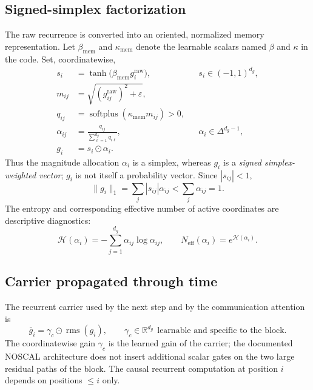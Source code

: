 \documentclass[11pt,a4paper]{article}
\newcommand{\R}{\mathbb{R}}
\newcommand{\softplus}{\operatorname{softplus}}
\newcommand{\gbar}{\bar g}
\begin{document}
\subsection{Signed-simplex factorization}

The raw recurrence is converted into an oriented, normalized memory representation. Let
$\beta_{\mathrm{mem}}$ and $\kappa_{\mathrm{mem}}$ denote the learnable scalars named $\beta$ and $\kappa$ in the code. Set, coordinatewise,
\begin{align}
s_i&=\tanh\bigl(\beta_{\mathrm{mem}}g_i^{\mathrm{raw}}\bigr), && s_i\in(-1,1)^{d_g},\\
m_{ij}&=\sqrt{(g_{ij}^{\mathrm{raw}})^2+\varepsilon},\\
q_{ij}&=\softplus(\kappa_{\mathrm{mem}}m_{ij})>0,\\
\alpha_{ij}&=\frac{q_{ij}}{\sum_{\ell=1}^{d_g}q_{i\ell}}, && \alpha_i\in\Delta^{d_g-1},\\
g_i&=s_i\odot\alpha_i.
\end{align}
Thus the magnitude allocation $\alpha_i$ is a simplex, whereas $g_i$ is a \emph{signed simplex-weighted
vector}; $g_i$ is not itself a probability vector. Since $|s_{ij}|<1$,
\begin{equation}
\|g_i\|_1=\sum_j|s_{ij}|\alpha_{ij}<\sum_j\alpha_{ij}=1.
\end{equation}
The entropy and corresponding effective number of active coordinates are descriptive diagnostics:
\begin{equation}
\mathcal H(\alpha_i)=-\sum_{j=1}^{d_g}\alpha_{ij}\log\alpha_{ij},\qquad
N_{\mathrm{eff}}(\alpha_i)=e^{\mathcal H(\alpha_i)}.
\end{equation}

\subsection{Carrier propagated through time}

The recurrent carrier used by the next step and by the communication attention is
\begin{equation}
\gbar_i=\gamma_c\odot\operatorname{rms}(g_i),\qquad \gamma_c\in\R^{d_g}\ \ \text{learnable and specific to the block.}
\end{equation}
The coordinatewise gain $\gamma_c$ is the learned gain of the carrier; the documented NOSCAL architecture
does not insert additional scalar gates on the two large residual paths of the block. The causal
recurrent computation at position $i$ depends on positions $\le i$ only.
\end{document}
